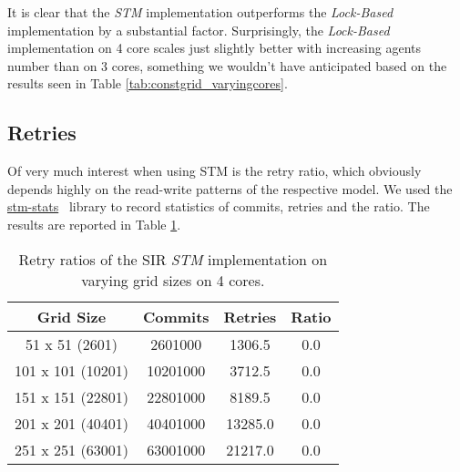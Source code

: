 It is clear that the \textit{STM} implementation outperforms the \textit{Lock-Based} implementation by a substantial factor. Surprisingly, the \textit{Lock-Based} implementation on 4 core scales just slightly better with increasing agents number than on 3 cores, something we wouldn't have anticipated based on the results seen in Table \ref{tab:constgrid_varyingcores}. %

\subsection{Retries}
Of very much interest when using STM is the retry ratio, which obviously depends highly on the read-write patterns of the respective model. We used the \href{http://hackage.haskell.org/package/stm-stats}{stm-stats}~\cite{stm_stats_library} library to record statistics of commits, retries and the ratio. The results are reported in Table \ref{tab:retries_stm}.

\begin{table}
	\centering
  	\begin{tabular}{ c || c | c | c }
        Grid Size 		   & Commits    & Retries & Ratio \\ \hline \hline 
   		51 x 51 (2601)    & 2601000  & 1306.5  & 0.0 \\ \hline
   		101 x 101 (10201) & 10201000 & 3712.5  & 0.0 \\ \hline
   		151 x 151 (22801) & 22801000 & 8189.5  & 0.0 \\ \hline
   		201 x 201 (40401) & 40401000 & 13285.0 & 0.0 \\ \hline 
   		251 x 251 (63001) & 63001000 & 21217.0 & 0.0 \\ \hline \hline
  	\end{tabular}
  	
  	\caption{Retry ratios of the SIR \textit{STM} implementation on varying grid sizes on 4 cores.}
	\label{tab:retries_stm}
\end{table}

